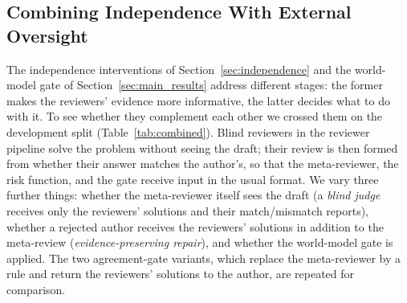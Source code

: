 \subsection{Combining Independence With External Oversight}
\label{sec:combined}

The independence interventions of Section~\ref{sec:independence} and the world-model gate of Section~\ref{sec:main_results} address different stages: the former makes the reviewers' evidence more informative, the latter decides what to do with it.
To see whether they complement each other we crossed them on the development split (Table~\ref{tab:combined}).
Blind reviewers in the reviewer pipeline solve the problem without seeing the draft; their review is then formed from whether their answer matches the author's, so that the meta-reviewer, the risk function, and the gate receive input in the usual format.
We vary three further things: whether the meta-reviewer itself sees the draft (a \emph{blind judge} receives only the reviewers' solutions and their match/mismatch reports), whether a rejected author receives the reviewers' solutions in addition to the meta-review (\emph{evidence-preserving repair}), and whether the world-model gate is applied.
The two agreement-gate variants, which replace the meta-reviewer by a rule and return the reviewers' solutions to the author, are repeated for comparison.

